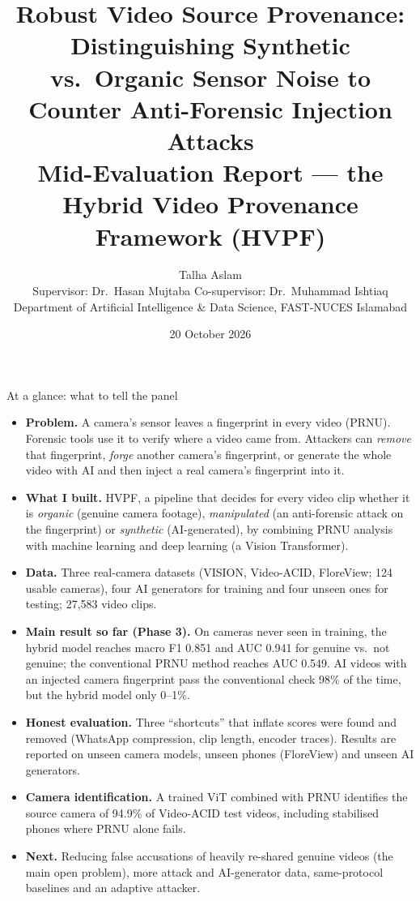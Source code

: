 \documentclass[11pt,a4paper]{article}
\title{\vspace{-1cm}\textbf{Robust Video Source Provenance: Distinguishing Synthetic vs.\ Organic Sensor Noise to Counter Anti-Forensic Injection Attacks}\\[8pt]
\large Mid-Evaluation Report --- the Hybrid Video Provenance Framework (HVPF)}
\author{Talha Aslam\\[2pt] \small Supervisor: Dr.\ Hasan Mujtaba \quad Co-supervisor: Dr.\ Muhammad Ishtiaq\\
\small Department of Artificial Intelligence \& Data Science, FAST-NUCES Islamabad}
\date{20 October 2026}
\begin{document}
\maketitle

\begin{keybox}{At a glance: what to tell the panel}
\begin{itemize}[leftmargin=12pt]
\item \textbf{Problem.} A camera's sensor leaves a fingerprint in every video (PRNU). Forensic tools use it to verify where a
      video came from. Attackers can \emph{remove} that fingerprint, \emph{forge} another camera's fingerprint, or generate the
      whole video with AI and then inject a real camera's fingerprint into it.
\item \textbf{What I built.} HVPF, a pipeline that decides for every video clip whether it is \emph{organic} (genuine camera
      footage), \emph{manipulated} (an anti-forensic attack on the fingerprint) or \emph{synthetic} (AI-generated), by combining
      PRNU analysis with machine learning and deep learning (a Vision Transformer).
\item \textbf{Data.} Three real-camera datasets (VISION, Video-ACID, FloreView; 124 usable cameras), four AI generators for
      training and four unseen ones for testing; 27,583 video clips.
\item \textbf{Main result so far (Phase 3).} On cameras never seen in training, the hybrid model reaches macro F1 0.851 and
      AUC 0.941 for genuine vs.\ not genuine; the conventional PRNU method reaches AUC 0.549. AI videos with an injected camera
      fingerprint pass the conventional check 98\% of the time, but the hybrid model only 0--1\%.
\item \textbf{Honest evaluation.} Three ``shortcuts'' that inflate scores were found and removed (WhatsApp compression,
      clip length, encoder traces). Results are reported on unseen camera models, unseen phones (FloreView) and unseen AI generators.
\item \textbf{Camera identification.} A trained ViT combined with PRNU identifies the source camera of 94.9\% of
      Video-ACID test videos, including stabilised phones where PRNU alone fails.
\item \textbf{Next.} Reducing false accusations of heavily re-shared genuine videos (the main open problem), more attack and
      AI-generator data, same-protocol baselines and an adaptive attacker.
\end{itemize}
\end{keybox}
\end{document}
